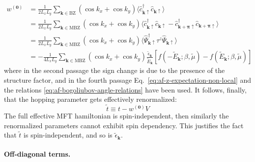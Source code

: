 \begin{align}
	w^{(\mathbf{0})} &= \frac{1}{2L_xL_y} \sum_{\mathbf{k}\in\mathrm{BZ}} \left(
		\cos k_x + \cos k_y
	\right) \langle
	\hat c_{\mathbf{k}\uparrow}^\dagger \hat c_{\mathbf{k}\uparrow}
	\rangle \nonumber \\
	&= \frac{1}{2L_xL_y} \sum_{\mathbf{k}\in\mathrm{MBZ}} \left(
		\cos k_x + \cos k_y
	\right) \langle
	\hat c_{\mathbf{k}\uparrow}^\dagger  \hat c_{\mathbf{k}\uparrow} - \hat c_{\mathbf{k}+\bm{\pi}\uparrow}^\dagger  \hat c_{\mathbf{k}+\bm{\pi}\uparrow}
	\rangle \nonumber \\
	&= \frac{1}{2L_xL_y} \sum_{\mathbf{k}\in\mathrm{MBZ}} \left(
		\cos k_x + \cos k_y
	\right) \langle
		\hat \Psi_{\mathbf{k}\uparrow}^\dagger \tau^z \hat \Psi_{\mathbf{k}\uparrow}
	\rangle \nonumber \\
	&= -\frac{1}{4L_xL_y} \sum_{\mathbf{k}\in\mathrm{MBZ}} \left(
		\cos k_x + \cos k_y
	\right) \frac{\tilde{\epsilon}_\mathbf{k}}{\tilde{E}_\mathbf{k}} \left[
		f\left(
			-\tilde{E}_\mathbf{k};\beta,\tilde{\mu}
		\right) - f\left(
			\tilde{E}_\mathbf{k};\beta,\tilde{\mu}
		\right)
	\right] \label{eq:af-renormalized-self-consistent-equation-w0}
\end{align}
where in the second passage the sign change is due to the presence of the structure factor, and in the fourth passage Eq.~\eqref{eq:af-z-expectation-non-local} and the relations \eqref{eq:af-bogoliubov-angle-relations} have been used. It follows, finally, that the hopping parameter gets effectively renormalized:
\begin{equation}\label{eq:af-fock-hop-ss-renormalization}
	\tilde{t} \equiv t - w^{(\mathbf{0})}V
\end{equation}
The full effective MFT hamiltonian is spin-independent, then similarly the renormalized parameters cannot exhibit spin dependency. This justifies the fact that $\tilde{t}$ is spin-independent, and so is $\tilde{\epsilon}_\mathbf{k}$.

\paragraph{Off-diagonal terms.}

